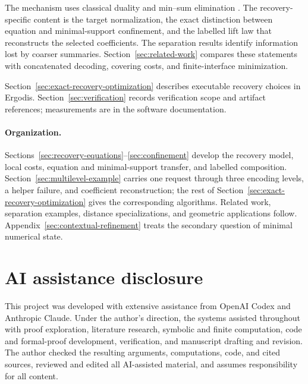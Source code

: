 \documentclass[11pt]{article}
\theoremstyle{definition}
\begin{document}
The mechanism uses classical duality and min--sum elimination
\cite{AjiMcEliece2000}.  The recovery-specific content is the target
normalization, the exact distinction between equation and minimal-support
confinement, and the labelled lift law that reconstructs the selected
coefficients.  The separation results identify information lost by coarser
summaries.  Section~\ref{sec:related-work} compares these statements with
concatenated decoding, covering costs, and finite-interface minimization.

Section~\ref{sec:exact-recovery-optimization} describes executable recovery
choices in Ergodis.  Section~\ref{sec:verification} records verification scope
and artifact references; measurements are in the software documentation.

\paragraph{Organization.}
Sections~\ref{sec:recovery-equations}--\ref{sec:confinement} develop the
recovery model, local costs, equation and minimal-support transfer, and
labelled composition.  Section~\ref{sec:multilevel-example} carries one
request through three encoding levels, a helper failure, and coefficient
reconstruction; the rest of Section~\ref{sec:exact-recovery-optimization}
gives the corresponding algorithms.  Related work, separation examples,
distance specializations, and geometric applications follow.
Appendix~\ref{sec:contextual-refinement} treats the secondary question of
minimal numerical state.













\section*{AI assistance disclosure}

This project was developed with extensive assistance from OpenAI Codex and
Anthropic Claude. Under the author's direction, the systems assisted
throughout with proof exploration, literature research, symbolic and finite
computation, code and formal-proof development, verification, and manuscript
drafting and revision. The author checked the resulting arguments,
computations, code, and cited sources, reviewed and edited all AI-assisted
material, and assumes responsibility for all content.

\appendix


\footnotesize


\end{document}
